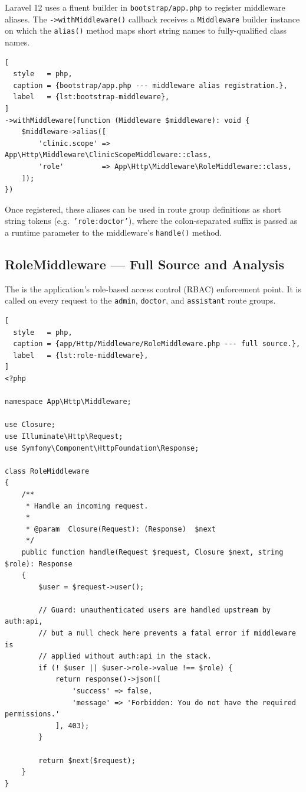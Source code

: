 Laravel 12 uses a fluent builder in \texttt{bootstrap/app.php} to
register middleware aliases. The \texttt{->withMiddleware()} callback
receives a \texttt{Middleware} builder instance on which the
\texttt{alias()} method maps short string names to fully-qualified
class names.

\begin{lstlisting}[
  style   = php,
  caption = {bootstrap/app.php --- middleware alias registration.},
  label   = {lst:bootstrap-middleware},
]
->withMiddleware(function (Middleware $middleware): void {
    $middleware->alias([
        'clinic.scope' => App\Http\Middleware\ClinicScopeMiddleware::class,
        'role'         => App\Http\Middleware\RoleMiddleware::class,
    ]);
})
\end{lstlisting}

Once registered, these aliases can be used in route group definitions
as short string tokens (e.g.\ \texttt{'role:doctor'}), where the
colon-separated suffix is passed as a runtime parameter to the
middleware's \texttt{handle()} method.

\subsection{RoleMiddleware --- Full Source and Analysis}

The  is the application's role-based access
control (RBAC) enforcement point. It is called on every request to the
\texttt{admin}, \texttt{doctor}, and \texttt{assistant} route groups.

\begin{lstlisting}[
  style   = php,
  caption = {app/Http/Middleware/RoleMiddleware.php --- full source.},
  label   = {lst:role-middleware},
]
<?php

namespace App\Http\Middleware;

use Closure;
use Illuminate\Http\Request;
use Symfony\Component\HttpFoundation\Response;

class RoleMiddleware
{
    /**
     * Handle an incoming request.
     *
     * @param  Closure(Request): (Response)  $next
     */
    public function handle(Request $request, Closure $next, string $role): Response
    {
        $user = $request->user();

        // Guard: unauthenticated users are handled upstream by auth:api,
        // but a null check here prevents a fatal error if middleware is
        // applied without auth:api in the stack.
        if (! $user || $user->role->value !== $role) {
            return response()->json([
                'success' => false,
                'message' => 'Forbidden: You do not have the required permissions.'
            ], 403);
        }

        return $next($request);
    }
}
\end{lstlisting}

